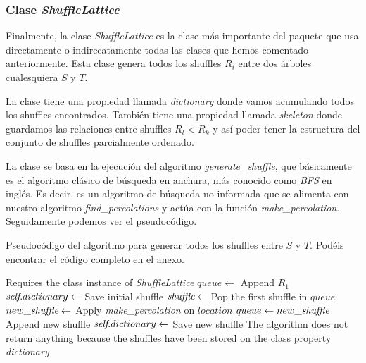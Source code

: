 \documentclass[../main.tex]{subfiles}
\begin{document}
\subsubsection*{Clase \emph{ShuffleLattice}}
Finalmente, la clase \emph{ShuffleLattice} es la clase m\'as importante del paquete que usa directamente o indirecatamente todas las clases que hemos comentado anteriormente. Esta clase genera todos los shuffles $R_i$ entre dos \'arboles cualesquiera $S$ y $T$.

La clase tiene una propiedad llamada \emph{dictionary} donde vamos acumulando todos los shuffles encontrados. Tambi\'en tiene una propiedad llamada \emph{skeleton} donde guardamos las relaciones entre shuffles $R_l < R_k$ y as\'i poder tener la estructura del conjunto de shuffles parcialmente ordenado.

La clase se basa en la ejecuci\'on del algoritmo \emph{generate\_shuffle}, que b\'asicamente es el algoritmo cl\'asico de b\'usqueda en anchura, m\'as conocido como \emph{BFS} en ingl\'es. Es decir, es un algoritmo de b\'usqueda no informada que se alimenta con nuestro algoritmo \emph{find\_percolations} y act\'ua con la funci\'on \emph{make\_percolation}.
Seguidamente podemos ver el pseudoc\'odigo.

\begin{algoritmo}
    \caption{Pseudoc\'odigo del algoritmo para generar todos los shuffles entre $S$ y $T$. Pod\'eis encontrar el c\'odigo completo en el anexo.}
    \begin{algorithmic}[1]
        \Require Requires the class instance of \emph{ShuffleLattice}
        \State $queue\leftarrow$ Append $R_1$ 
        \State $\emph{self}.dictionary\leftarrow$ Save initial shuffle
        \State $\emph{shuffle} \leftarrow$ Pop the first shuffle in $queue$
        \State $new\_\emph{shuffle} \leftarrow$ Apply \emph{make\_percolation} on $location$
        \State $queue\leftarrow new\_\emph{shuffle}$ Append new shuffle
        \State $\emph{self}.dictionary\leftarrow$ Save new shuffle
        \EndIf
        \EndFor
        \EndWhile
        \EndFunction
        \Ensure The algorithm does not return anything because the shuffles have been stored on the class property \emph{dictionary}
    \end{algorithmic}
\end{algoritmo}
\end{document}
